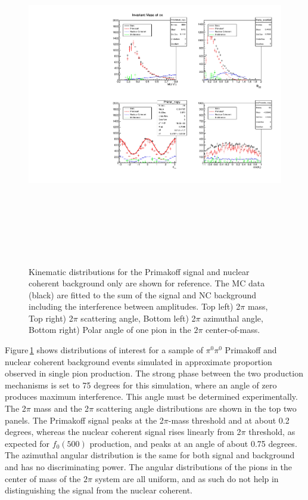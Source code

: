  \begin{figure}[tbp]
\begin{center}
\includegraphics[height=15cm,clip=true]{figures/twopi_primakoff_DSelect_test_File_100000_decomposition_PrimNC.pdf}
\caption{Kinematic distributions for the Primakoff signal and nuclear coherent background only are shown for reference. The MC data (black) are fitted to the sum of the signal and NC background including the interference between amplitudes. 
Top left) 2$\pi$ mass, Top right) 2$\pi$ scattering angle, Bottom left) 2$\pi$ azimuthal angle, 
Bottom right) Polar angle of one pion in the $2\pi$ center-of-mass.
\label{fig:decomposition_PrimNC}}
\end{center} 
\end{figure}

Figure\,\ref{fig:decomposition_PrimNC} shows distributions of interest
for a sample of $\pi^0\pi^0$ Primakoff and nuclear coherent background
events simulated in approximate proportion observed in single pion
production. The strong phase between the two production mechanisms is
set to 75 degrees for this simulation, where an angle of zero produces
maximum interference. This angle must be determined experimentally.
The 2$\pi$ mass and the 2$\pi$ scattering angle distributions are
shown in the top two panels. The Primakoff signal peaks at the
2$\pi$-mass threshold and at about 0.2 degrees, whereas the nuclear
coherent signal rises linearly from 2$\pi$ threshold, as expected for
$f_0(500)$ production, and peaks at an angle of about 0.75
degrees. The azimuthal angular distribution is the same for both
signal and background and has no discriminating power. The angular
distributions of the pions in the center of mass of the $2\pi$ system
are all uniform, and as such do not help in distinguishing the signal
from the nuclear coherent.

